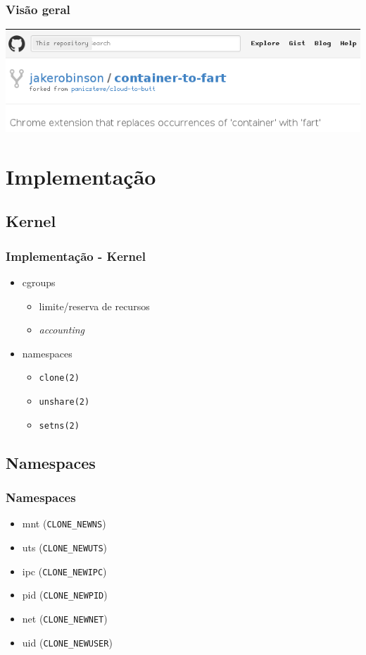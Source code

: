 \documentclass{beamer}
\begin{document}
\begin{frame}
    \frametitle{Visão geral}
    \centering
    \includegraphics[width=0.8\linewidth]{img/chrome_extension.png}
\end{frame}

\section{Implementação}

\subsection{Kernel}

\begin{frame}
    \frametitle{Implementação - Kernel}
    \begin{itemize}
        \item cgroups
            \begin{itemize}
                \item limite/reserva de recursos
                \item \textit{accounting}
            \end{itemize}
        \item namespaces
            \begin{itemize}
                \item \texttt{clone(2)}
                \item \texttt{unshare(2)}
                \item \texttt{setns(2)}
            \end{itemize}
    \end{itemize}
\end{frame}

\subsection{Namespaces}

\begin{frame}
    \frametitle{Namespaces}
    \begin{itemize}
        \item mnt (\texttt{CLONE\_NEWNS})
        \item uts (\texttt{CLONE\_NEWUTS})
        \item ipc (\texttt{CLONE\_NEWIPC})
        \item pid (\texttt{CLONE\_NEWPID})
        \item net (\texttt{CLONE\_NEWNET})
        \item uid (\texttt{CLONE\_NEWUSER})
    \end{itemize}
\end{frame}
\end{document}
